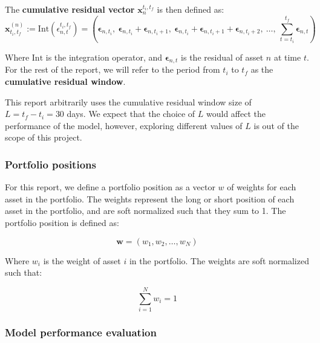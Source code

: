 \documentclass[12pt]{article}
\begin{document}
The \textbf{cumulative residual vector} $\mathbf{x}_n^{t_i, t_f}$ is then defined as:
\begin{equation}
    \mathbf{x}_{t_i,t_f}^{(n)} := \mathrm{Int}(\epsilon^{t_i, t_f}_{n,t}) 
      = \left( \mathbf{\epsilon}_{n,t_i},\ \mathbf{\epsilon}_{n,t_i} + \mathbf{\epsilon}_{n,t_i+1},\ \mathbf{\epsilon}_{n,t_i} + \mathbf{\epsilon}_{n,t_i+1} + \mathbf{\epsilon}_{n,t_i+2},\ \ldots,\ \sum_{t=t_i}^{t_f} \mathbf{\epsilon}_{n,t} \right)
    \label{eq:cumulative_residual}
\end{equation}

Where $\mathrm{Int}$ is the integration operator, and $\mathbf{\epsilon}_{n,t}$ is the residual of asset $n$ at time $t$. For the rest of the report, we will refer to the period from $t_i$ to $t_f$ as the \textbf{cumulative residual window}.

This report arbitrarily uses the cumulative residual window size of $L=t_f-t_i=30$ days. We expect that the choice of $L$ would affect the performance of the model, however, exploring different values of $L$ is out of the scope of this project.

\subsubsection{Portfolio positions}

For this report, we define a portfolio position as a vector $w$ of weights for each asset in the portfolio. The weights represent the long or short position of each asset in the portfolio, and are soft normalized such that they sum to 1. The portfolio position is defined as:

\begin{equation}
    \mathbf{w} = (w_1, w_2, \ldots, w_N)
    \label{eq:portfolio_weights}
\end{equation}

Where $w_i$ is the weight of asset $i$ in the portfolio. The weights are soft normalized such that:

\begin{equation}
    \sum_{i=1}^{N} w_i = 1
    \label{eq:portfolio_weights_normalization}
\end{equation}

\subsubsection{Model performance evaluation} 
\end{document}
